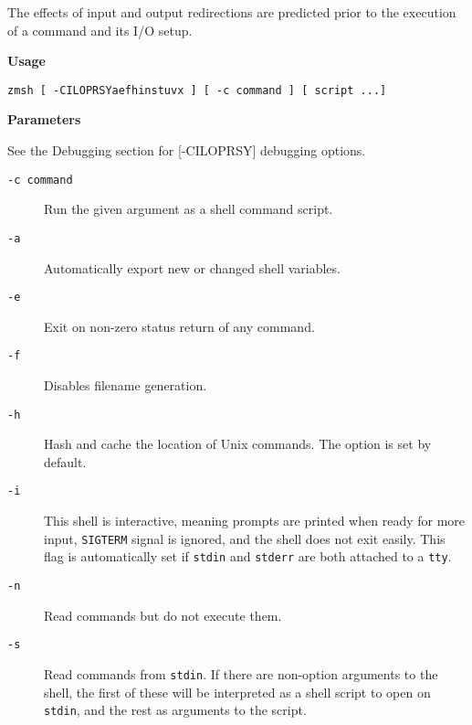 The effects of input and output redirections are predicted 
prior to the execution of a command and its I/O setup.

{\bf Usage}

\begin{tscreen}
\begin{verbatim}
zmsh [ -CILOPRSYaefhinstuvx ] [ -c command ] [ script ...] 
\end{verbatim}
\end{tscreen}


{\bf Parameters}

See the Debugging section for [-CILOPRSY] 
debugging options. 

\begin{description}
\item[{\tt -c command}] \mbox{}

Run the given argument as a shell 
command script. 

\item[{\tt -a}] \mbox{}

Automatically export new or changed shell 
variables.  

\item[{\tt -e}] \mbox{}

Exit on non-zero status return of any command. 

\item[{\tt -f}] \mbox{}

Disables filename generation. 

\item[{\tt -h}] \mbox{}

Hash and cache the location of Unix commands. 
The option is set by default. 

\item[{\tt -i}] \mbox{}

This shell is interactive, meaning prompts 
are printed when ready for more input, {\tt SIGTERM} signal 
is ignored, and the shell does not exit easily. This flag is 
automatically set if {\tt stdin} and {\tt stderr} are 
both attached to a {\tt tty}. 

\item[{\tt -n}] \mbox{}

Read commands but do not execute them. 

\item[{\tt -s}] \mbox{}

Read commands from {\tt stdin}. If there 
are non-option arguments to the shell, the first of these will 
be interpreted as a shell script to open on {\tt stdin}, 
and the rest as arguments to the script. 


\end{description}
